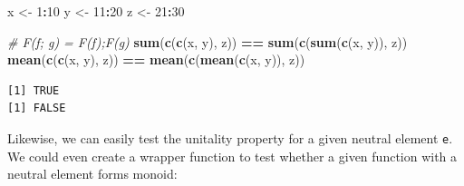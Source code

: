 \documentclass[
  openany]{book}
\newenvironment{Shaded}{\begin{snugshade}}{\end{snugshade}}
\newcommand{\CommentTok}[1]{\textcolor[rgb]{0.56,0.35,0.01}{\textit{#1}}}
\newcommand{\DecValTok}[1]{\textcolor[rgb]{0.00,0.00,0.81}{#1}}
\newcommand{\FunctionTok}[1]{\textcolor[rgb]{0.13,0.29,0.53}{\textbf{#1}}}
\newcommand{\NormalTok}[1]{#1}
\newcommand{\OtherTok}[1]{\textcolor[rgb]{0.56,0.35,0.01}{#1}}
\newcommand{\SpecialCharTok}[1]{\textcolor[rgb]{0.81,0.36,0.00}{\textbf{#1}}}
\theoremstyle{definition}
\theoremstyle{definition}
\theoremstyle{definition}
\theoremstyle{definition}
\theoremstyle{remark}
\begin{document}
\begin{Shaded}
\begin{Highlighting}[]
\NormalTok{x }\OtherTok{\textless{}{-}} \DecValTok{1}\SpecialCharTok{:}\DecValTok{10}
\NormalTok{y }\OtherTok{\textless{}{-}} \DecValTok{11}\SpecialCharTok{:}\DecValTok{20}
\NormalTok{z }\OtherTok{\textless{}{-}} \DecValTok{21}\SpecialCharTok{:}\DecValTok{30}

\CommentTok{\#     F(f; g)       =     F(f);F(g)}
\FunctionTok{sum}\NormalTok{(}\FunctionTok{c}\NormalTok{(}\FunctionTok{c}\NormalTok{(x, y), z)) }\SpecialCharTok{==} \FunctionTok{sum}\NormalTok{(}\FunctionTok{c}\NormalTok{(}\FunctionTok{sum}\NormalTok{(}\FunctionTok{c}\NormalTok{(x, y)), z))}
\FunctionTok{mean}\NormalTok{(}\FunctionTok{c}\NormalTok{(}\FunctionTok{c}\NormalTok{(x, y), z)) }\SpecialCharTok{==} \FunctionTok{mean}\NormalTok{(}\FunctionTok{c}\NormalTok{(}\FunctionTok{mean}\NormalTok{(}\FunctionTok{c}\NormalTok{(x, y)), z))}
\end{Highlighting}
\end{Shaded}

\begin{verbatim}
[1] TRUE
[1] FALSE
\end{verbatim}

Likewise, we can easily test the unitality property for a given neutral element \texttt{e}. We could even create a wrapper function to test whether a given function with a neutral element forms monoid:
\end{document}

